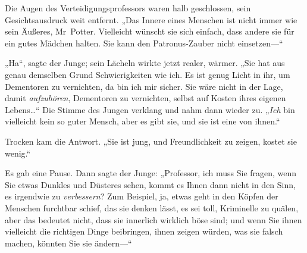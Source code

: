 Die Augen des Verteidigungsprofessors waren halb geschlossen, sein Gesichtsausdruck weit entfernt. „Das Innere eines Menschen ist nicht immer wie sein Äußeres, Mr~Potter. Vielleicht wünscht sie sich einfach, dass andere sie für ein gutes Mädchen halten. Sie kann den Patronus-Zauber nicht einsetzen—“

„Ha“, sagte der Junge; sein Lächeln wirkte jetzt realer, wärmer. „Sie hat aus genau demselben Grund Schwierigkeiten wie ich. Es ist genug Licht in ihr, um Dementoren zu vernichten, da bin ich mir sicher. Sie wäre nicht in der Lage, damit \emph{aufzuhören}, Dementoren zu vernichten, selbst auf Kosten ihres eigenen Lebens…“ Die Stimme des Jungen verklang und nahm dann wieder zu. „\emph{Ich} bin vielleicht kein so guter Mensch, aber es gibt sie, und sie ist eine von ihnen.“

Trocken kam die Antwort. „Sie ist jung, und Freundlichkeit zu zeigen, kostet sie wenig.“

Es gab eine Pause. Dann sagte der Junge: „Professor, ich muss Sie fragen, wenn Sie etwas Dunkles und Düsteres sehen, kommt es Ihnen dann nicht in den Sinn, es irgendwie zu \emph{verbessern}? Zum Beispiel, ja, etwas geht in den Köpfen der Menschen furchtbar schief, das sie denken lässt, es sei toll, Kriminelle zu quälen, aber das bedeutet nicht, dass sie innerlich wirklich böse sind; und wenn Sie ihnen vielleicht die richtigen Dinge beibringen, ihnen zeigen würden, was sie falsch machen, könnten Sie sie ändern—“

